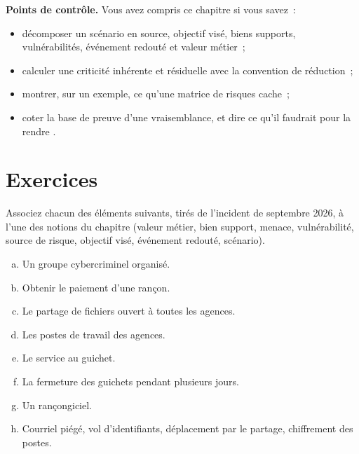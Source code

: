 \begin{boxinfo}
\textbf{Points de contrôle.} Vous avez compris ce chapitre si vous savez~:
\begin{itemize}
    \item décomposer un scénario en source, objectif visé, biens supports,
          vulnérabilités, événement redouté et valeur métier~;
    \item calculer une criticité inhérente et résiduelle avec la convention
          de réduction~;
    \item montrer, sur un exemple, ce qu'une matrice de risques cache~;
    \item coter la base de preuve d'une vraisemblance, et dire ce qu'il
          faudrait pour la rendre \OUI{}.
\end{itemize}
\end{boxinfo}

\section*{Exercices}

\begin{boxexo}[title={\ding{45}\quad Exercice~2.1. Le vocabulaire du scénario \niveaubase}]
Associez chacun des éléments suivants, tirés de l'incident de septembre
2026, à l'une des notions du chapitre (valeur métier, bien support,
menace, vulnérabilité, source de risque, objectif visé, événement redouté,
scénario).
\begin{enumerate}[(a)]
    \item Un groupe cybercriminel organisé.
    \item Obtenir le paiement d'une rançon.
    \item Le partage de fichiers ouvert à toutes les agences.
    \item Les postes de travail des agences.
    \item Le service au guichet.
    \item La fermeture des guichets pendant plusieurs jours.
    \item Un rançongiciel.
    \item Courriel piégé, vol d'identifiants, déplacement par le partage,
          chiffrement des postes.
\end{enumerate}
\end{boxexo}

